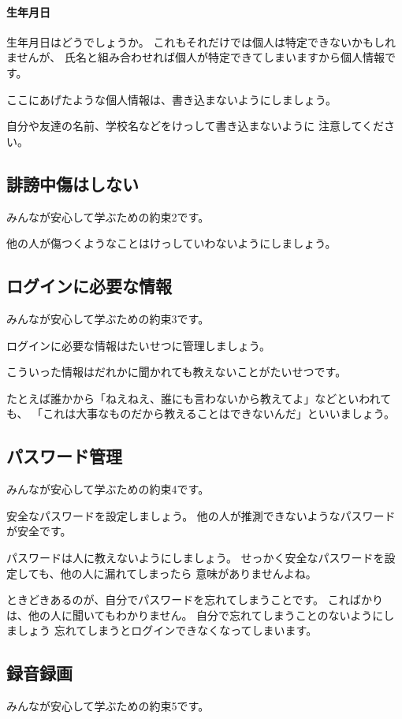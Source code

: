 \documentclass[12pt]{jlreq}
\begin{document}
\paragraph{生年月日}
生年月日はどうでしょうか。
これもそれだけでは個人は特定できないかもしれませんが、
氏名と組み合わせれば個人が特定できてしまいますから個人情報です。

ここにあげたような個人情報は、書き込まないようにしましょう。

自分や友達の名前、学校名などをけっして書き込まないように
注意してください。


\subsection{誹謗中傷はしない}


みんなが安心して学ぶための約束2です。

他の人が傷つくようなことはけっしていわないようにしましょう。



\subsection{ログインに必要な情報}
みんなが安心して学ぶための約束3です。

ログインに必要な情報はたいせつに管理しましょう。

こういった情報はだれかに聞かれても教えないことがたいせつです。

たとえば誰かから「ねえねえ、誰にも言わないから教えてよ」などといわれても、
「これは大事なものだから教えることはできないんだ」といいましょう。

\subsection{パスワード管理}
みんなが安心して学ぶための約束4です。

安全なパスワードを設定しましょう。
他の人が推測できないようなパスワードが安全です。


パスワードは人に教えないようにしましょう。
せっかく安全なパスワードを設定しても、他の人に漏れてしまったら
意味がありませんよね。

ときどきあるのが、自分でパスワードを忘れてしまうことです。
こればかりは、他の人に聞いてもわかりません。
自分で忘れてしまうことのないようにしましょう
忘れてしまうとログインできなくなってしまいます。



\subsection{録音録画}
みんなが安心して学ぶための約束5です。
\end{document}
